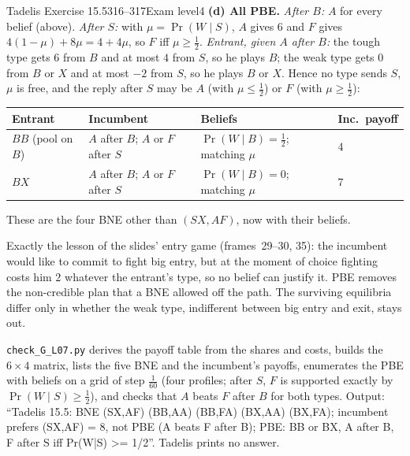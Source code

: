 \begin{exsol}{Tadelis Exercise 15.5}{316--317}{Exam level}{4}
\textbf{(d) All PBE.} \emph{After $B$:} $A$ for every belief (above). \emph{After $S$:} with
$\mu = \Pr(W \mid S)$, $A$ gives $6$ and $F$ gives $4(1-\mu) + 8\mu = 4 + 4\mu$, so $F$ iff $\mu \ge \frac12$.
\emph{Entrant, given $A$ after $B$:} the tough type gets $6$ from $B$ and at most $4$ from $S$, so he plays $B$;
the weak type gets $0$ from $B$ or $X$ and at most $-2$ from $S$, so he plays $B$ or $X$. Hence no type sends $S$,
$\mu$ is free, and the reply after $S$ may be $A$ (with $\mu \le \frac12$) or $F$ (with $\mu \ge \frac12$):
\begin{center}
\small
\begin{tabular}{llll}
\toprule
Entrant & Incumbent & Beliefs & Inc.\ payoff \\
\midrule
$BB$ (pool on $B$) & $A$ after $B$; $A$ or $F$ after $S$ & $\Pr(W \mid B) = \frac12$; matching $\mu$ & $4$ \\
$BX$ & $A$ after $B$; $A$ or $F$ after $S$ & $\Pr(W \mid B) = 0$; matching $\mu$ & $7$ \\
\bottomrule
\end{tabular}
\end{center}
These are the four BNE other than $(SX, AF)$, now with their beliefs.

\interp Exactly the lesson of the slides' entry game (frames~29--30, 35): the incumbent would like to commit to
fight big entry, but at the moment of choice fighting costs him $2$ whatever the entrant's type, so no belief
can justify it. PBE removes the non-credible plan that a BNE allowed off the path. The surviving equilibria
differ only in whether the weak type, indifferent between big entry and exit, stays out.

\verify \texttt{check\_G\_L07.py} derives the payoff table from the shares and costs, builds the $6\times4$ matrix,
lists the five BNE and the incumbent's payoffs, enumerates the PBE with beliefs on a grid of step $\frac1{60}$
(four profiles; after $S$, $F$ is supported exactly by $\Pr(W \mid S) \ge \frac12$), and checks that $A$ beats $F$
after $B$ for both types. Output: ``Tadelis 15.5: BNE (SX,AF) (BB,AA) (BB,FA) (BX,AA) (BX,FA); incumbent prefers
(SX,AF) = 8, not PBE (A beats F after B); PBE: BB or BX, A after B, F after S iff Pr(W|S) >= 1/2''. Tadelis
prints no answer.


\end{exsol}
